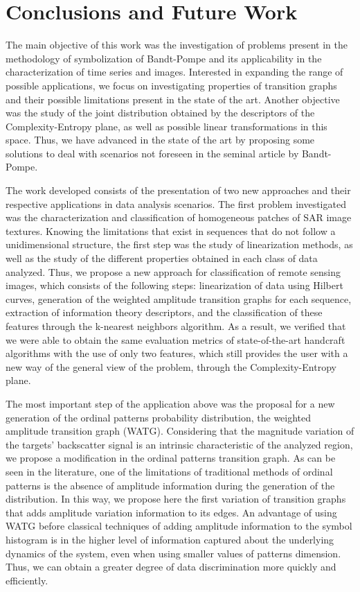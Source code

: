 \chapter{Conclusions and Future Work}\label{chapter:conclusion}

The main objective of this work was the investigation of problems present in the methodology of symbolization of Bandt-Pompe and its applicability in the characterization of time series and images.
Interested in expanding the range of possible applications, we focus on investigating properties of transition graphs and their possible limitations present in the state of the art.
Another objective was the study of the joint distribution obtained by the descriptors of the Complexity-Entropy plane, as well as possible linear transformations in this space.
Thus, we have advanced in the state of the art by proposing some solutions to deal with scenarios not foreseen in the seminal article by Bandt-Pompe.

The work developed consists of the presentation of two new approaches and their respective applications in data analysis scenarios.
The first problem investigated was the characterization and classification of homogeneous patches of SAR image textures.
Knowing the limitations that exist in sequences that do not follow a unidimensional structure, the first step was the study of linearization methods, as well as the study of the different properties obtained in each class of data analyzed.
Thus, we propose a new approach for classification of remote sensing images, which consists of the following steps: linearization of data using Hilbert curves, generation of the weighted amplitude transition graphs for each sequence, extraction of information theory descriptors, and the classification of these features through the k-nearest neighbors algorithm.
As a result, we verified that we were able to obtain the same evaluation metrics of state-of-the-art handcraft algorithms with the use of only two features, which still provides the user with a new way of the general view of the problem, through the Complexity-Entropy plane.

The most important step of the application above was the proposal for a new generation of the ordinal patterns probability distribution, the weighted amplitude transition graph (WATG).
Considering that the magnitude variation of the targets' backscatter signal is an intrinsic characteristic of the analyzed region, we propose a modification in the ordinal patterns transition graph.
As can be seen in the literature, one of the limitations of traditional methods of ordinal patterns is the absence of amplitude information during the generation of the distribution.
In this way, we propose here the first variation of transition graphs that adds amplitude variation information to its edges.
An advantage of using WATG before classical techniques of adding amplitude information to the symbol histogram is in the higher level of information captured about the underlying dynamics of the system, even when using smaller values of patterns dimension.
Thus, we can obtain a greater degree of data discrimination more quickly and efficiently.

